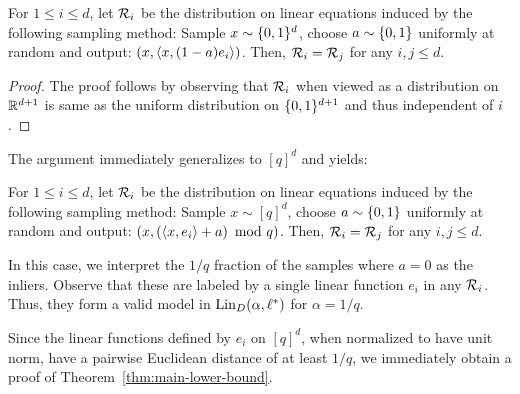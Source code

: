 \begin{lemma}
For $1 \leq i \leq d$, let $\mathcal R_i$ be the distribution on linear equations induced by the following sampling method: Sample $x \sim \{0,1\}^d$, choose $a \sim \{0,1\}$ uniformly at random and output: $(x, \langle x, (1-a)e_i\rangle)$. Then, $\mathcal R_i = \mathcal R_j$ for any $i,j \leq  d$. 
\end{lemma}



\begin{proof}
The proof follows by observing that $\mathcal R_i$ when viewed as a distribution on  $\mathbb R^{d+1}$ is same as the uniform distribution on  $\{0,1\}^{d+1}$ and thus independent of $i$. 
\end{proof}

The argument immediately generalizes to $[q]^d$ and yields:

\begin{lemma}
For $1 \leq i \leq d$, let $\mathcal R_i$ be the distribution on linear equations induced by the following sampling method: Sample $x \sim [q]^d$, choose $a \sim \{0,1\}$ uniformly at random and output: $(x, \left(\langle x, e_i\rangle+a\right) \text{ mod } q)$. Then, $\mathcal R_i = \mathcal R_j$ for any $i,j \leq  d$. 
\end{lemma}

In this case, we interpret the $1/q$ fraction of the samples where $a = 0$ as the inliers. 
Observe that these are labeled by a single linear  function $e_i$ in any $\mathcal R_i$. 
Thus, they form a valid model in $\mathrm{Lin}_D(\alpha,\ell^*)$ for $\alpha =  1/q$. 


Since the linear functions defined by $e_i$ on $[q]^d$, when normalized to have unit norm, have a pairwise Euclidean distance of at least $1/q$, we immediately obtain a proof of  Theorem~\ref{thm:main-lower-bound}.




